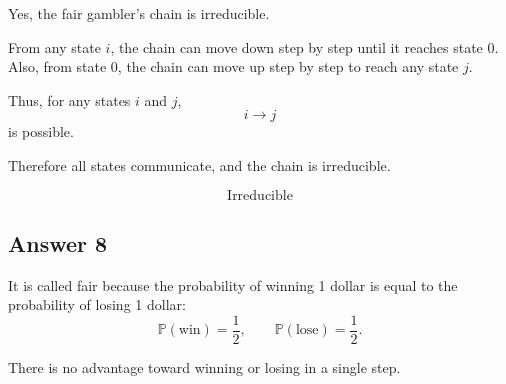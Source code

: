 \documentclass[12pt,a4paper]{article}
\theoremstyle{notestyle}
\newcommand{\Prob}{\mathbb{P}}
\begin{document}
Yes, the fair gambler's chain is irreducible.

From any state $i$, the chain can move down step by step until it reaches state $0$. Also, from state $0$, the chain can move up step by step to reach any state $j$.

Thus, for any states $i$ and $j$,
\[
i\to j
\]
is possible.

Therefore all states communicate, and the chain is irreducible.

\[
\boxed{\text{Irreducible}}
\]

\subsection*{Answer 8}

It is called fair because the probability of winning 1 dollar is equal to the probability of losing 1 dollar:
\[
\Prob(\text{win})=\frac12,
\qquad
\Prob(\text{lose})=\frac12.
\]

There is no advantage toward winning or losing in a single step.
\end{document}
